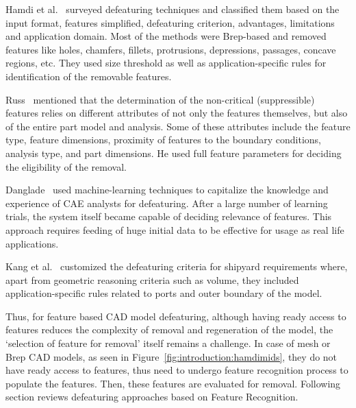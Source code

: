
Hamdi et al.~\cite{Hamdi2012a} surveyed defeaturing techniques and classified them based on the input format, features simplified, defeaturing criterion, advantages, limitations and application domain. Most of the methods were Brep-based and removed features like holes, chamfers, fillets, protrusions, depressions, passages, concave regions, etc. They used size threshold as well as application-specific rules for identification of the removable features.  

Russ~\cite{Russ2012} mentioned that the determination of the non-critical (suppressible) features relies on different attributes of not only the features themselves, but also of the entire part model and analysis. Some of these attributes include the feature type, feature dimensions, proximity of features to the boundary conditions, analysis type, and part dimensions. He used full feature parameters for deciding the eligibility of the removal. 

	
	Danglade~\cite{Danglade2013} used machine-learning techniques to capitalize the knowledge and experience of CAE analysts for defeaturing. After a large number of learning trials, the system itself became capable of deciding relevance of features. This approach requires feeding of huge initial data to be effective for usage as real life applications.

	Kang et al.~\cite{Kang2013} customized the defeaturing criteria for shipyard requirements where, apart from geometric reasoning criteria such as volume, they included application-specific rules related to ports and outer boundary of the model.
	
Thus, for feature based CAD model defeaturing, although having ready access to features reduces the complexity of removal and regeneration of the model, the `selection of feature for removal' itself remains a challenge. In case of mesh or Brep CAD models, as seen in Figure~\ref{fig:introduction:hamdimids}, they do not have ready access to features, thus need to undergo feature recognition process to populate the features. Then, these features are evaluated for removal. Following section reviews defeaturing approaches based on Feature Recognition.
	
